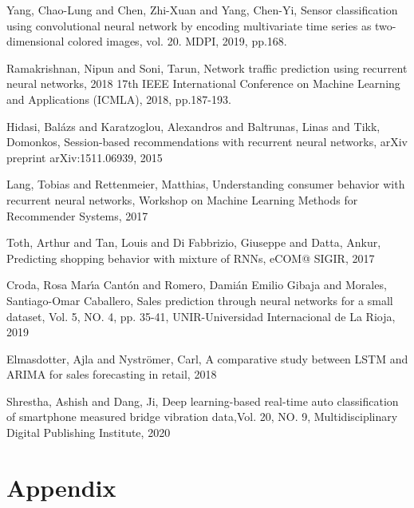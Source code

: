 \documentclass[conference]{IEEEtran}
\begin{document}
\begin{thebibliography}{00}
 Yang, Chao-Lung and Chen, Zhi-Xuan and Yang, Chen-Yi, Sensor classification using convolutional neural network by encoding multivariate time series as two-dimensional colored images, vol. 20. MDPI, 2019, pp.168.

 Ramakrishnan, Nipun and Soni, Tarun, Network traffic prediction using recurrent neural networks, 2018 17th IEEE International Conference on Machine Learning and Applications (ICMLA), 2018, pp.187-193.

 Hidasi, Bal{\'a}zs and Karatzoglou, Alexandros and Baltrunas, Linas and Tikk, Domonkos, Session-based recommendations with recurrent neural networks, arXiv preprint arXiv:1511.06939, 2015

 Lang, Tobias and Rettenmeier, Matthias, Understanding consumer behavior with recurrent neural networks, Workshop on Machine Learning Methods for Recommender Systems, 2017
 
 Toth, Arthur and Tan, Louis and Di Fabbrizio, Giuseppe and Datta, Ankur, Predicting shopping behavior with mixture of RNNs, eCOM@ SIGIR, 2017

 Croda, Rosa Mar{\'\i}a Cant{\'o}n and Romero, Dami{\'a}n Emilio Gibaja and Morales, Santiago-Omar Caballero, Sales prediction through neural networks for a small dataset, Vol. 5, NO. 4, pp. 35-41, UNIR-Universidad Internacional de La Rioja, 2019

 Elmasdotter, Ajla and Nystr{\"o}mer, Carl, A comparative study between LSTM and ARIMA for sales forecasting in retail, 2018

 Shrestha, Ashish and Dang, Ji, Deep learning-based real-time auto classification of smartphone measured bridge vibration data,Vol. 20, NO. 9, Multidisciplinary Digital Publishing Institute, 2020
\end{thebibliography}

\section{Appendix}
\end{document}
